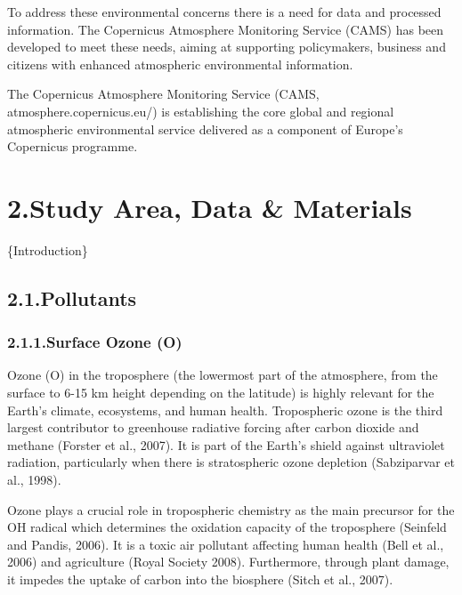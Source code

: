\documentclass[9pt]{report}
\begin{document}
To address these environmental concerns there is a need for data and 
processed information. The Copernicus Atmosphere Monitoring Service (CAMS) 
has been developed to meet these needs, aiming at supporting policymakers, 
business and citizens with enhanced atmospheric environmental information.%

The Copernicus Atmosphere Monitoring Service (CAMS, atmosphere.copernicus.eu/) is establishing the core global and regional atmospheric environmental service delivered as a component of Europe's Copernicus programme.%

\section{2.\hspace*{0.5em}Study Area, Data \& Materials}\label{sec-study-area-data-materials}%

\noindent{}\{Introduction\}%

\subsection{2.1.\hspace*{0.5em}Pollutants}\label{sec-pollutants}%

\subsubsection{2.1.1.\hspace*{0.5em}Surface Ozone (O)}\label{sec-surface-ozone-o3}%

\noindent{}Ozone (O) in the troposphere (the lowermost part of the atmosphere, from the surface to 6-15 km height depending on the latitude) is highly relevant for the Earth’s climate, ecosystems, and human health.
Tropospheric ozone is the third largest contributor to greenhouse radiative forcing after carbon dioxide and methane (Forster et al., 2007).
It is part of the Earth’s shield against ultraviolet radiation, particularly when there is stratospheric ozone depletion (Sabziparvar et al., 1998).%

Ozone plays a crucial role in tropospheric chemistry as the main precursor for the OH radical which determines the oxidation capacity of the troposphere (Seinfeld and Pandis, 2006). 
It is a toxic air pollutant affecting human health (Bell et al., 2006) and agriculture (Royal Society 2008).
Furthermore, through plant damage, it impedes the uptake of carbon into the biosphere (Sitch et al., 2007).%
\end{document}
